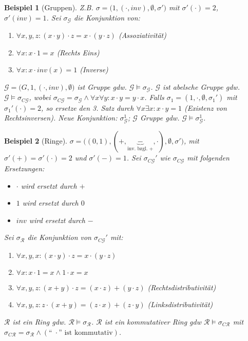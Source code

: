 \documentclass{article}
\theoremstyle{definition}
\theoremstyle{plain}
\newtheorem*{bsp}{Beispiel}
\newcommand{\m}[1]{\mathcal{#1}}
\begin{document}
    \begin{bsp}[Gruppen]
        Z.B. $ \sigma = \big(1, (\cdot, inv), \emptyset, \sigma'\big) $ mit $ \sigma'(\cdot) = 2 $, $ \sigma'(inv) = 1 $.
        Sei $ \sigma_{\m{G}} $ die Konjunktion von:
        \begin{enumerate}
            \item $ \forall x, y, z: (x \cdot y) \cdot z = x \cdot ( y \cdot z) $ \hfill \textit{(Assoziativität)}
            \item $ \forall x: x \cdot 1 = x $ \hfill \textit{(Rechts Eins)}
            \item $ \forall x: x \cdot inv(x) = 1 $ \hfill \textit{(Inverse)}
        \end{enumerate}
        $ \m{G} = \big(G, 1, (\cdot, inv), \emptyset\big) $ ist Gruppe gdw. $ \m{G} \models \sigma_{\m{G}} $.
        $ \m{G} $ ist abelsche Gruppe gdw. $ \m{G} \models \sigma_{C\m{G}} $, wobei $ \sigma_{C\m{G}} = \sigma_{\m{G}} \land \forall x \forall y: x \cdot y = y \cdot x $.
        Falls $ \sigma_1 = (1, \cdot, \emptyset, \sigma_1') $ mit $ \sigma_1'(\cdot) = 2 $, so ersetze den 3. Satz durch $ \forall x \exists x: x \cdot y = 1 $ \textit{(Existenz von Rechtsinversen)}.
        Neue Konjunktion: $ \sigma_{\m{G}}^1 $; $ \m{G} $ Gruppe gdw. $ \m{G} \models \sigma_{\m{G}}^1 $.
    \end{bsp}

    \begin{bsp}[Ringe]
        $ \sigma = \big((0, 1), (+, \underbrace{-}_{\text{inv. bzgl. }+}, \cdot), \emptyset, \sigma' \big) $, mit $ \sigma'(+) = \sigma'(\cdot) = 2 $ und $ \sigma'(-) = 1 $.
        Sei $ \sigma_{C\m{G}}' $ wie $ \sigma_{C\m{G}} $ mit folgenden Ersetzungen:
        \begin{itemize}
            \item $ \cdot $ wird ersetzt durch $ + $
            \item $ 1 $ wird ersetzt durch $ 0 $
            \item $ inv $ wird ersetzt durch $ - $
        \end{itemize}
        Sei $ \sigma_{\m{R}} $ die Konjunktion von $ \sigma_{C\m{G}}' $ mit:
        \begin{enumerate}
            \item $ \forall x, y, x : (x \cdot y) \cdot z = x \cdot (y \cdot z) $
            \item $ \forall x: x \cdot 1 = x \land 1 \cdot x = x $
            \item $ \forall x, y, z: (x + y) \cdot z = (x \cdot z) + (y \cdot z) $ \hfill \textit{(Rechtsdistributivität)}
            \item $ \forall x, y, z: z \cdot (x + y) = (z \cdot x) + (z \cdot y) $ \hfill \textit{(Linksdistributivität)}
        \end{enumerate}
        $ \m{R} $ ist ein Ring gdw. $ \m{R} \models \sigma_{\m{R}} $.
        $ \m{R} $ ist ein kommutativer Ring gdw $ \m{R} \models \sigma_{C\m{R}} $ mit $ \sigma_{C\m{R}} = \sigma_{\m{R}} \land (\text{``$\;\cdot$'' ist kommutativ}) $.
    \end{bsp}
\end{document}
